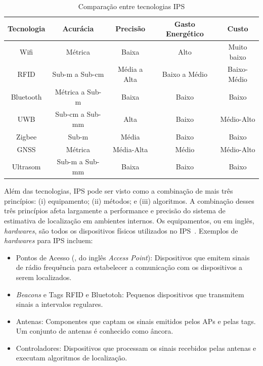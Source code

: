 \begin{table}[H]
    \centering
    \caption{Comparação entre tecnologias IPS}
    \begin{tabular}{|c|c|c|c|c|}
        \hline 
         \textbf{Tecnologia} & \textbf{Acurácia} & \textbf{Precisão} & \textbf{Gasto Energético} & \textbf{Custo}  \\
         \hline
         \hline
         Wifi& Métrica & Baixa & Alto & Muito baixo\\
         RFID & Sub-m a Sub-cm& Média a Alta & Baixo a Médio & Baixo-Médio\\
         Bluetooth& Métrica a Sub-m &Baixa&Baixo&Baixo\\
         UWB&Sub-cm a Sub-mm&Alta&Baixo&Médio-Alto\\
         Zigbee&Sub-m&Média&Baixo&Baixo\\
         GNSS&Métrica&Média-Alta&Médio&Médio-Alto \\
         Ultrasom&Sub-m a Sub-mm&Baixa&Baixo&Baixo\\
         
         \hline
    \end{tabular}
    \label{tab:ips_comparation}
\end{table}

Além das tecnologias, IPS pode ser visto como a combinação de mais três princípios: (i) equipamento; (ii) métodos; e (iii) algoritmos. A combinação desses três princípios afeta largamente a performance e precisão do sistema de estimativa de localização em ambientes internos. Os equipamentos, ou em inglês, \textit{hardwares}, são todos os dispositivos físicos utilizados no IPS~\cite{Chun2020}. Exemplos de \textit{hardwares} para IPS incluem:
 \begin{itemize}
     \item Pontos de Acesso (, do inglês \textit{Access Point}): Dispositivos que emitem sinais de rádio frequência para estabelecer a comunicação com os dispositivos a serem localizados.

     \item \textit{Beacons} e Tags RFID e Bluetotoh: Pequenos dispositivos que transmitem sinais a intervalos regulares.

     \item  Antenas: Componentes que captam os sinais emitidos pelos APs e pelas tags. Um conjunto de antenas é conhecido como âncora.

     \item Controladores: Dispositivos que processam os sinais recebidos pelas antenas e executam algoritmos de localização.
 \end{itemize}

